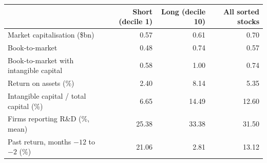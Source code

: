 \begin{tabular}{lrrr}
\toprule
 & Short (decile 1) & Long (decile 10) & All sorted stocks \\
\midrule
Market capitalisation (\$bn) & 0.57 & 0.61 & 0.70 \\
Book-to-market & 0.48 & 0.74 & 0.57 \\
Book-to-market with intangible capital & 0.58 & 1.00 & 0.74 \\
Return on assets (\%) & 2.40 & 8.14 & 5.35 \\
Intangible capital / total capital (\%) & 6.65 & 14.49 & 12.60 \\
Firms reporting R\&D (\%, mean) & 25.38 & 33.38 & 31.50 \\
Past return, months $-12$ to $-2$ (\%) & 21.06 & 2.81 & 13.12 \\
\bottomrule
\end{tabular}
